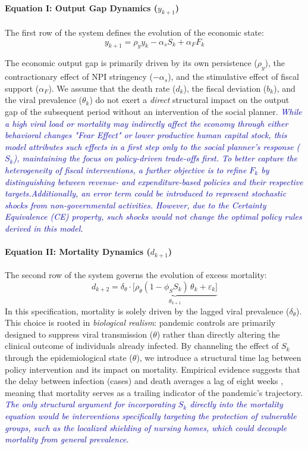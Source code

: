 \paragraph{Equation I: Output Gap Dynamics ($y_{k+1}$)}The first row of the system defines the evolution of the economic state:
\begin{equation}y_{k+1} = \rho_y y_k - \alpha_s S_k + \alpha_F F_k\end{equation}

The economic output gap is primarily driven by its own persistence ($\rho_y$), the contractionary effect of NPI stringency ($-\alpha_s$), and the stimulative effect of fiscal support ($\alpha_F$). We assume that the death rate ($d_k$), the fiscal deviation ($b_k$), and the viral prevalence ($\theta_k$) do not exert a \textit{direct} structural impact on the output gap of the subsequent period without an intervention of the social planner. \textit{\textcolor{blue}{While a high viral load or mortality may indirectly affect the economy through either behavioral changes "Fear Effect" or lower productive human capital stock, this model attributes such effects in a first step only to the social planner's response ($S_k$), maintaining the focus on policy-driven trade-offs first. To better capture the heterogeneity of fiscal interventions, a further objective is to refine $F_k$ by distinguishing between revenue- and expenditure-based policies and their respective targets.Additionally, an error term could be introduced to represent stochastic shocks from non-governmental activities. However, due to the Certainty Equivalence (CE) property, such shocks would not change the optimal policy rules derived in this model.}}


\paragraph{Equation II: Mortality Dynamics ($d_{k+1}$)} 
The second row of the system governs the evolution of excess mortality:
\begin{equation}
    d_{k+2} = \delta_\theta \cdot \underbrace{\bigl[\rho_\theta (1 - \phi_S S_k) \, \theta_k + \varepsilon_k\bigr]}_{\theta_{k+1}} 
    \label{eq:excess dynamics}
\end{equation}
In this specification, mortality is solely driven by the lagged viral prevalence ($\delta_\theta$). This choice is rooted in \textit{biological realism}: pandemic controls are primarily designed to suppress viral transmission ($\theta$) rather than directly altering the clinical outcome of individuals already infected. By channeling the effect of $S_k$ through the epidemiological state ($\theta$), we introduce a structural time lag between policy intervention and its impact on mortality. Empirical evidence suggests that the delay between infection (cases) and death averages a lag of eight weeks \citep{Gagnon2023}, meaning that mortality serves as a trailing indicator of the pandemic's trajectory. \textit{\textcolor{blue}{The only structural argument for incorporating $S_k$ directly into the mortality equation would be interventions specifically targeting the protection of vulnerable groups, such as the localized shielding of \textit{nursing homes}, which could decouple mortality from general prevalence.}}

